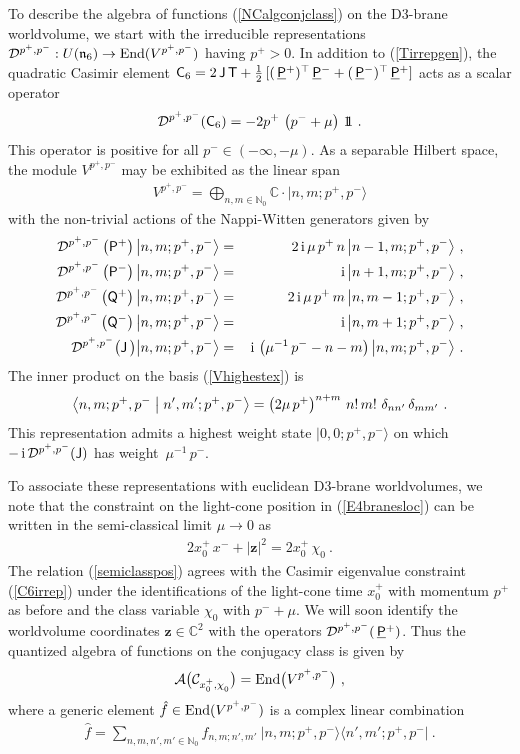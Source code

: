 \documentclass[11pt,a4paper]{article}
\newcommand{\ii}{{\rm i}}
\newcommand{\C}{\complex}
\newcommand{\mbf}[1]{{\boldsymbol {#1} }}
\def\ii{{\,{\rm i}\,}}
\def\P{{\sf P}}
\def\T{{\sf T}}
\def\Q{{\sf Q}}
\def\C{{\sf C}}
\def\J{{\sf J}}
\def\Pu{\underline{\sf P}{}}
\def\mz{{\mbf z}}
\def\mcDp{{\mathcal D}^{p^+,p^-}}
\newcommand{\complex}{{\mathbb C}} %
\newcommand{\nat}{{\mathbb N}} %
\newcommand{\id}{{1\!\!1}} %
\def\bea{\begin{eqnarray}}
\def\eea{\end{eqnarray}}
\newcommand{\beq}{\begin{eqnarray}}
\newcommand{\eeq}{\end{eqnarray}}
\begin{document}
To describe the algebra of functions (\ref{NCalgconjclass}) on the
D3-brane worldvolume, we start with the irreducible representations
$\mathcal{D}^{p^+,p^-}:U(\mathfrak{n}_6)\to{\rm End}(V^{p^+,p^-})$
having $p^+>0$. In addition to (\ref{Tirrepgen}), the quadratic
Casimir element ${\sf
  C}_6=2\,\J\,\T+\frac12\,[(\,\Pu^+)^\top\,\Pu^-+(\,\Pu^-)^\top\,\Pu^+]$
acts as a scalar operator
\beq
\mathcal{D}^{p^+,p^-}(\C_6)=-2p^+\,\left(p^-+\mu\right)\,\id \ .
\label{C6irrep}\eeq
This operator is positive for all $p^-\in(-\infty,-\mu)$. As a
separable Hilbert space, the module $V^{p^+,p^-}$ may be
exhibited as the linear span
\beq
V^{p^+,p^-}=\bigoplus_{n,m\in\nat_0}\complex\cdot\bigl|n,m;p^+,p^-
\bigr\rangle
\label{Vhighestex}\eeq
with the non-trivial actions of the Nappi-Witten generators given by
\bea
\mcDp\left(\P^+\right)\bigl|n,m;p^+,p^-\bigr\rangle&=&
2\ii\mu\,p^+\,n\,\bigl|n-1,m;p^+,p^-\bigr\rangle \ , \nonumber\\
\mcDp\left(\P^-\right)\bigl|n,m;p^+,p^-\bigr\rangle&=&
\ii\bigl|n+1,m;p^+,p^-\bigr\rangle \ , \nonumber\\
\mcDp\left(\Q^+\right)\bigl|n,m;p^+,p^-\bigr\rangle&=&
2\ii\mu\,p^+\,m\,\bigl|n,m-1;p^+,p^-\bigr\rangle \ , \nonumber\\
\mcDp\left(\Q^-\right)\bigl|n,m;p^+,p^-\bigr\rangle&=&
\ii\bigl|n,m+1;p^+,p^-\bigr\rangle \ , \nonumber\\
\mcDp\bigl(\J\,\bigr)\bigl|n,m;p^+,p^-\bigr\rangle&=&
\ii\left(\mu^{-1}\,p^--n-m\right)
\bigl|n,m;p^+,p^-\bigr\rangle \ .
\label{highestactions}\eea
The inner product on the basis (\ref{Vhighestex}) is
\beq
\bigl\langle n,m;p^+,p^-\bigm|n',m';p^+,p^-\bigr\rangle=
\left(2\mu\,p^+\right)^{n+m}\,n!\,m!~\delta_{nn'}\,\delta_{mm'} \ .
\label{highestortho}\eeq
This representation admits a highest weight state
$|0,0;p^+,p^-\rangle$ on which $-\ii\mcDp(\J)$ has
weight~$\mu^{-1}\,p^-$.

To associate these representations with euclidean D3-brane
worldvolumes, we note that the constraint on the light-cone position
in (\ref{E4branesloc}) can be written in the semi-classical limit
$\mu\to0$ as
\beq
2x_0^+\,x^-+|\mz|^2=2x_0^+\,\chi^{~}_0 \ .
\label{semiclasspos}\eeq
The relation (\ref{semiclasspos}) agrees with the Casimir eigenvalue
constraint (\ref{C6irrep}) under the identifications of the light-cone
time $x_0^+$ with momentum $p^+$ as before and the class variable
$\chi^{~}_0$ with $p^-+\mu$. We will soon identify the worldvolume coordinates
$\mz\in\complex^2$ with the operators $\mcDp(\,\Pu^+)$. Thus the quantized
algebra of functions on the conjugacy class is given by
\beq
\mathcal{A}\bigl(\mathcal{C}_{x_0^+,\chi^{~}_0}\bigr)=
{\rm End}\bigl(V^{p^+,p^-}\bigr) \ ,
\label{quantalgD3}\eeq
where a generic element $\hat f\in{\rm End}(V^{p^+,p^-})$ is a complex
linear combination
\beq
\hat f=\sum_{n,m,n',m'\in\nat_0}f_{n,m;n',m'}~\bigl|n,m;p^+,p^-
\bigr\rangle\bigl\langle n',m';p^+,p^-\bigr| \ .
\label{genlincombD3}\eeq
\end{document}
